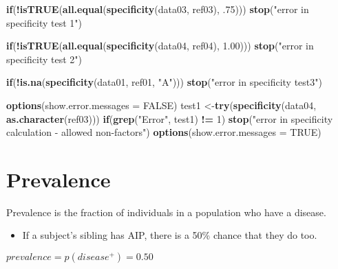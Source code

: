 \documentclass[
]{article}
\newenvironment{Shaded}{\begin{snugshade}}{\end{snugshade}}
\newcommand{\ControlFlowTok}[1]{\textcolor[rgb]{0.13,0.29,0.53}{\textbf{#1}}}
\newcommand{\DataTypeTok}[1]{\textcolor[rgb]{0.13,0.29,0.53}{#1}}
\newcommand{\DecValTok}[1]{\textcolor[rgb]{0.00,0.00,0.81}{#1}}
\newcommand{\FloatTok}[1]{\textcolor[rgb]{0.00,0.00,0.81}{#1}}
\newcommand{\KeywordTok}[1]{\textcolor[rgb]{0.13,0.29,0.53}{\textbf{#1}}}
\newcommand{\NormalTok}[1]{#1}
\newcommand{\OperatorTok}[1]{\textcolor[rgb]{0.81,0.36,0.00}{\textbf{#1}}}
\newcommand{\OtherTok}[1]{\textcolor[rgb]{0.56,0.35,0.01}{#1}}
\newcommand{\StringTok}[1]{\textcolor[rgb]{0.31,0.60,0.02}{#1}}
\providecommand{\tightlist}{%
  \setlength{\itemsep}{0pt}\setlength{\parskip}{0pt}}
\begin{document}
\begin{Shaded}
\begin{Highlighting}[]
\ControlFlowTok{if}\NormalTok{(}\OperatorTok{!}\KeywordTok{isTRUE}\NormalTok{(}\KeywordTok{all.equal}\NormalTok{(}\KeywordTok{specificity}\NormalTok{(data03, ref03), }\FloatTok{.75}\NormalTok{))) }\KeywordTok{stop}\NormalTok{(}\StringTok{"error in specificity test 1"}\NormalTok{)}

\ControlFlowTok{if}\NormalTok{(}\OperatorTok{!}\KeywordTok{isTRUE}\NormalTok{(}\KeywordTok{all.equal}\NormalTok{(}\KeywordTok{specificity}\NormalTok{(data04, ref04), }\FloatTok{1.00}\NormalTok{))) }\KeywordTok{stop}\NormalTok{(}\StringTok{"error in specificity test 2"}\NormalTok{)}

\ControlFlowTok{if}\NormalTok{(}\OperatorTok{!}\KeywordTok{is.na}\NormalTok{(}\KeywordTok{specificity}\NormalTok{(data01, ref01, }\StringTok{"A"}\NormalTok{))) }\KeywordTok{stop}\NormalTok{(}\StringTok{"error in specificity test3"}\NormalTok{)}

\KeywordTok{options}\NormalTok{(}\DataTypeTok{show.error.messages =} \OtherTok{FALSE}\NormalTok{)}
\NormalTok{test1 <-}\KeywordTok{try}\NormalTok{(}\KeywordTok{specificity}\NormalTok{(data04, }\KeywordTok{as.character}\NormalTok{(ref03)))}
\ControlFlowTok{if}\NormalTok{(}\KeywordTok{grep}\NormalTok{(}\StringTok{"Error"}\NormalTok{, test1) }\OperatorTok{!=}\StringTok{ }\DecValTok{1}\NormalTok{)}
  \KeywordTok{stop}\NormalTok{(}\StringTok{"error in specificity calculation - allowed non-factors"}\NormalTok{)}
\KeywordTok{options}\NormalTok{(}\DataTypeTok{show.error.messages =} \OtherTok{TRUE}\NormalTok{)}
\end{Highlighting}
\end{Shaded}

\hypertarget{prevalence}{%
\section{Prevalence}\label{prevalence}}

Prevalence is the fraction of individuals in a population who have a
disease.

\begin{itemize}
\tightlist
\item
  If a subject's sibling has AIP, there is a 50\% chance that they do
  too.
\end{itemize}

\(prevalence = p(disease^+) = 0.50\)
\end{document}
